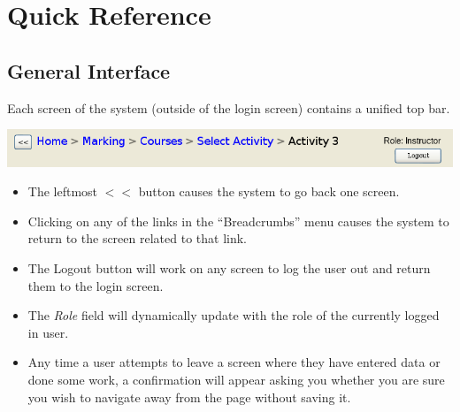 \documentclass{article}
\begin{document}
\section{Quick Reference}  %
\subsection{General Interface}
Each screen of the system (outside of the login screen) contains a unified top bar. \\
\centerline{\includegraphics[scale=0.55]{../images/UIMockups/pngs/topBar}}
\begin{itemize}
  \item The leftmost $<<$ button causes the system to go back one screen. 
  \item Clicking on any of the links in the ``Breadcrumbs'' menu causes the system 
    to return to the screen related to that link. 
  \item The Logout button will work on any screen to log the user out and return
    them to the login screen.
  \item The \emph{Role} field will dynamically update with the role of the currently logged
    in user.
  \item Any time a user attempts to leave a screen where they have entered data or
    done some work, a confirmation will appear asking you whether you are sure
    you wish to navigate away from the page without saving it.
\end{itemize}
\end{document}
